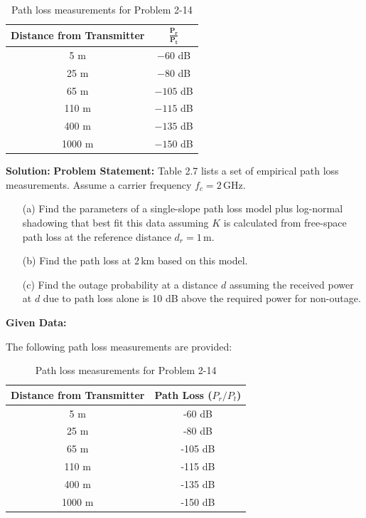 \documentclass[a4paper,12pt]{book}
\begin{document}
	\begin{table}[h!]
		\centering
		\caption{Path loss measurements for Problem 2-14}
		\begin{tabular}{|c|c|}
			\hline
			\textbf{Distance from Transmitter} & $\mathbf{\frac{P_r}{P_t}}$ \\
			\hline
			5 m   & $-60$ dB \\
			25 m  & $-80$ dB \\
			65 m  & $-105$ dB \\
			110 m & $-115$ dB \\
			400 m & $-135$ dB \\
			1000 m & $-150$ dB \\
			\hline
		\end{tabular}
	\end{table}
	\textbf{Solution:} \textbf{Problem Statement:} Table 2.7 lists a set of empirical path loss measurements. Assume a carrier frequency \( f_c = 2 \, \text{GHz} \).
	
	\begin{itemize}
		\item [(a)] Find the parameters of a single-slope path loss model plus log-normal shadowing that best fit this data assuming \( K \) is calculated from free-space path loss at the reference distance \( d_r = 1 \, \text{m} \).
		\item [(b)] Find the path loss at \( 2 \, \text{km} \) based on this model.
		\item [(c)] Find the outage probability at a distance \( d \) assuming the received power at \( d \) due to path loss alone is 10 dB above the required power for non-outage.
	\end{itemize}
	
	\textbf{Given Data:}
	
	The following path loss measurements are provided:
	
	\begin{table}[h!]
		\centering
		\begin{tabular}{|c|c|}
			\hline
			\textbf{Distance from Transmitter} & \textbf{Path Loss} (\( P_r / P_t \)) \\
			\hline
			5 m    & -60 dB \\
			25 m   & -80 dB \\
			65 m   & -105 dB \\
			110 m  & -115 dB \\
			400 m  & -135 dB \\
			1000 m & -150 dB \\
			\hline
		\end{tabular}
		\caption{Path loss measurements for Problem 2-14}
	\end{table}
	
\end{document}
